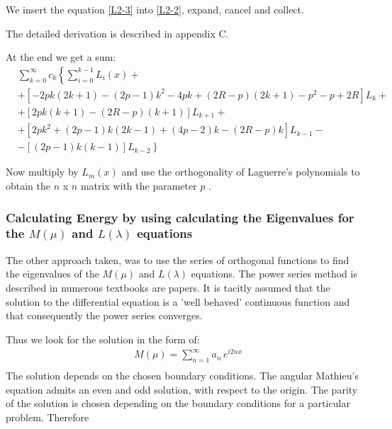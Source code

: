 We insert the equation \ref{L2-3} into \ref{L2-2}, expand, cancel and collect.

The detailed derivation is described in appendix C.

At the end we get a sum:
\begin{equation}
\begin{split}
&  \sum_{k=0}^{\infty}c_k \left\{ \sum_{i = 0}^{k-1}{L_i(x)}  +  \right. \\[.8em] 
& + \left[ -2pk(2k+1) -(2p-1)k^2 -4pk +(2R-p)(2k+1) - p^2 -p + 2R \right]L_k + \\[.8em]
& + \left[2pk(k+1) - (2R-p)(k+1) \right]L_{k+1} + \\[.8em]
& + \left[2pk^2 + (2p-1)k(2k-1) + (4p-2)k - (2R-p)k \right]L_{k-1} - \\[.8em]
& \left. - \left[ (2p-1)k(k-1)  \right]L_{k-2}  \right\}
\end{split}
\end{equation}

Now multiply by $ L_m(x) $ and use the orthogonality of Laguerre's polynomials to obtain the $ n $ x $ n $ matrix with the parameter $ p $ .

\subsubsection{Calculating Energy by using calculating the Eigenvalues for the $ M(\mu) $ and $ L(\lambda) $ equations }

The other approach taken, was to use the series of orthogonal functions to find the eigenvalues of the $ M(\mu) $ and $ L(\lambda) $ equations. The power series method is described in numerous textbooks are papers. It is tacitly assumed that the solution to the differential equation is a 'well behaved' continuous function and that consequently the power series converges.

Thus we look for the solution in the form of:
\begin{equation}\label{MSol}
\begin{split}
& M(\mu) = \sum_{n=1}^{\infty}{a_n\,e^{i2nx}} \\[.8em]
\end{split}
\end{equation}
The solution depends on the chosen boundary conditions. The angular Mathieu's equation admits an even and odd solution, with respect to the origin. The parity of the solution is chosen depending on the boundary conditions for a particular problem. Therefore

